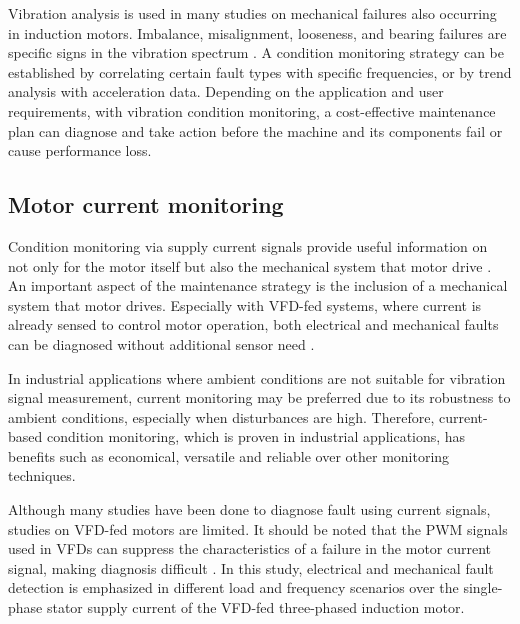 Vibration analysis is used in many studies on mechanical failures also occurring in induction motors. Imbalance, misalignment, looseness, and bearing failures are specific signs in the vibration spectrum \cite{thorsen1998methods}. A condition monitoring strategy can be established by correlating certain fault types with specific frequencies, or by trend analysis with acceleration data. Depending on the application and user requirements, with vibration condition monitoring, a cost-effective maintenance plan can diagnose and take action before the machine and its components fail or cause performance loss.

\subsection{Motor current monitoring}

Condition monitoring via supply current signals provide useful information on not only for the motor itself but also the mechanical system that motor drive \cite{thomson2001current}. An important aspect of the maintenance strategy is the inclusion of a mechanical system that motor drives. Especially with VFD-fed systems, where current is already sensed to control motor operation, both electrical and mechanical faults can be diagnosed without additional sensor need \cite{thomson2001current,gritli2017condition,corne2017misalignment,en201320958}. 

In industrial applications where ambient conditions are not suitable for vibration signal measurement, current monitoring may be preferred due to its robustness to ambient conditions, especially when disturbances are high.
Therefore, current-based condition monitoring, which is proven in industrial applications, has benefits such as economical, versatile and reliable over other monitoring techniques.

Although many studies have been done to diagnose fault using current signals, studies on VFD-fed motors are limited. It should be noted that the PWM signals used in VFDs can suppress the characteristics of a failure in the motor current signal, making diagnosis difficult \cite{shaeboub2018monitoring}. In this study, electrical and mechanical fault detection is emphasized in different load and frequency scenarios over the single-phase stator supply current of the VFD-fed three-phased induction motor.


